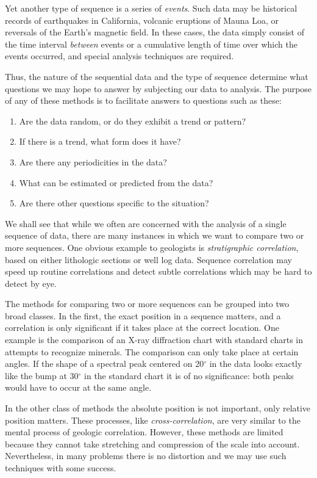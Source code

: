 	Yet another type of sequence is a series of \emph{events}.  Such data may be historical records of 
earthquakes in California, volcanic eruptions of Mauna Loa, or reversals of the Earth's magnetic field.
In these cases, the data simply consist of the time interval \emph{between} events or a cumulative length of time over
which the events occurred, and special analysis techniques are required.

Thus, the nature of the sequential data and the type of sequence determine what questions we 
may hope to answer by subjecting our data to analysis.  The purpose of any of these methods is to 
facilitate answers to questions such as these:
\begin{enumerate}
\item	Are the data random, or do they exhibit a trend or pattern?
	\item	If there is a trend, what form does it have?
	\item	Are there any periodicities in the data?
	\item	What can be estimated or predicted from the data?
	\item	Are there other questions specific to the situation?
\end{enumerate}

	We shall see that while we often are concerned with the analysis of a single sequence of data, there 
are many instances in which we want to compare two or more sequences.  One obvious example 
to geologists is \emph{stratigraphic correlation}, based on either lithologic sections or well log data.  Sequence 
correlation may speed up routine correlations and detect subtle correlations which may be hard to 
detect by eye.

The methods for comparing two or more sequences can be grouped into two 
broad classes.
In the first, the exact position in a sequence matters, and a correlation is only 
significant if it takes place at the correct location.  One example is the comparison of an X-ray 
diffraction chart with standard charts in attempts to recognize minerals.  The comparison can 
only take place at certain angles.  If the shape of a spectral peak centered on 20$^\circ$ in the data looks 
exactly like the bump at 30$^\circ$ in the standard chart it is of no significance: both peaks would have 
to occur at the same angle.

     In the other class of methods the absolute position is not important, only relative position 
matters.  These processes, like \emph{cross-correlation}, are very similar to the mental process of 
geologic correlation.  However, these methods are limited because they cannot take stretching 
and compression of the scale into account.  Nevertheless, in many problems there is no distortion and we may 
use such techniques with some success.

